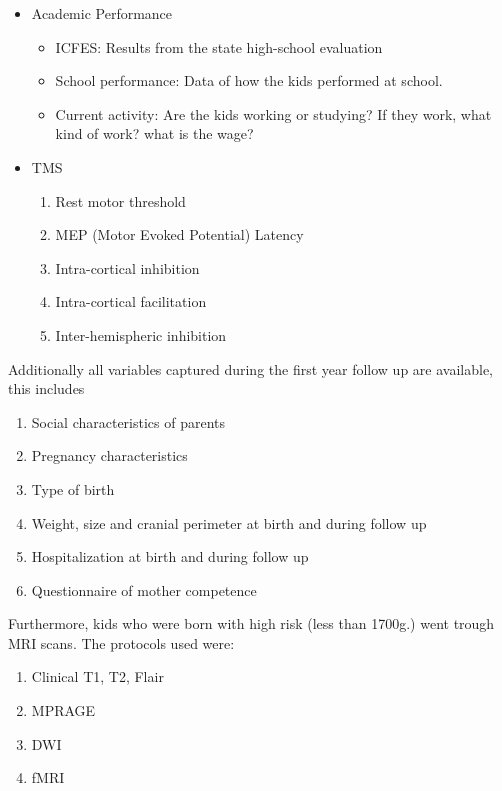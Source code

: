 \begin{itemize}
\begin{itemize}
	\end{itemize}
	\item Academic Performance
	\begin{itemize}
		\item ICFES: Results from the state high-school evaluation
		\item School performance: Data of how the kids performed at school.
		\item Current activity: Are the kids working or studying? If they work, what kind of work? what is the wage?
	\end{itemize}
	\item TMS %
	\begin{enumerate}
		\item Rest motor threshold
		\item MEP (Motor Evoked Potential) Latency
		\item Intra-cortical inhibition
		\item Intra-cortical facilitation
		\item Inter-hemispheric inhibition
	\end{enumerate}
\end{itemize}



Additionally all variables captured during the first year follow up are available, this includes

\begin{enumerate}
\item Social characteristics of parents
\item Pregnancy characteristics 
\item Type of birth
\item Weight, size and cranial perimeter at birth and during follow up
\item Hospitalization at birth and during follow up
\item Questionnaire of mother competence
\end{enumerate}

Furthermore, kids who were born with high risk (less than 1700g.) went trough MRI scans. The protocols used were:

\begin{enumerate}
	\item Clinical T1, T2, Flair
	\item MPRAGE
	\item DWI
	\item fMRI	
\end{enumerate}

